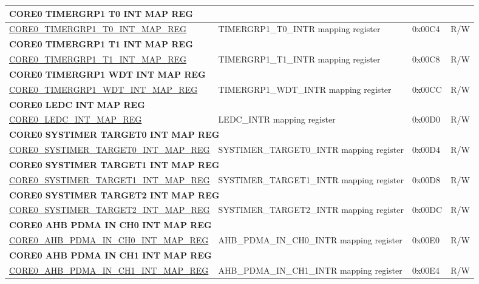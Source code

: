 \begin{longtable}{ | p{7.5cm} | p{7.2cm} | p{1.3cm} | p{1cm} | }
\multicolumn{4}{|l|}{\textbf{CORE0 TIMERGRP1 T0 INT MAP REG}} \\ \hline
\hyperref[regdesc:CORE0TIMERGRP1T0INTMAPREG]{CORE0\_TIMERGRP1\_T0\_INT\_MAP\_REG} & TIMERGRP1\_T0\_INTR mapping register & 0x00C4 & R/W \\ \hline
\multicolumn{4}{|l|}{\textbf{CORE0 TIMERGRP1 T1 INT MAP REG}} \\ \hline
\hyperref[regdesc:CORE0TIMERGRP1T1INTMAPREG]{CORE0\_TIMERGRP1\_T1\_INT\_MAP\_REG} & TIMERGRP1\_T1\_INTR mapping register & 0x00C8 & R/W \\ \hline
\multicolumn{4}{|l|}{\textbf{CORE0 TIMERGRP1 WDT INT MAP REG}} \\ \hline
\hyperref[regdesc:CORE0TIMERGRP1WDTINTMAPREG]{CORE0\_TIMERGRP1\_WDT\_INT\_MAP\_REG} & TIMERGRP1\_WDT\_INTR mapping register & 0x00CC & R/W \\ \hline
\multicolumn{4}{|l|}{\textbf{CORE0 LEDC INT MAP REG}} \\ \hline
\hyperref[regdesc:CORE0LEDCINTMAPREG]{CORE0\_LEDC\_INT\_MAP\_REG} & LEDC\_INTR mapping register & 0x00D0 & R/W \\ \hline
\multicolumn{4}{|l|}{\textbf{CORE0 SYSTIMER TARGET0 INT MAP REG}} \\ \hline
\hyperref[regdesc:CORE0SYSTIMERTARGET0INTMAPREG]{CORE0\_SYSTIMER\_TARGET0\_INT\_MAP\_REG} & SYSTIMER\_TARGET0\_INTR mapping register & 0x00D4 & R/W \\ \hline
\multicolumn{4}{|l|}{\textbf{CORE0 SYSTIMER TARGET1 INT MAP REG}} \\ \hline
\hyperref[regdesc:CORE0SYSTIMERTARGET1INTMAPREG]{CORE0\_SYSTIMER\_TARGET1\_INT\_MAP\_REG} & SYSTIMER\_TARGET1\_INTR mapping register & 0x00D8 & R/W \\ \hline
\multicolumn{4}{|l|}{\textbf{CORE0 SYSTIMER TARGET2 INT MAP REG}} \\ \hline
\hyperref[regdesc:CORE0SYSTIMERTARGET2INTMAPREG]{CORE0\_SYSTIMER\_TARGET2\_INT\_MAP\_REG} & SYSTIMER\_TARGET2\_INTR mapping register & 0x00DC & R/W \\ \hline
\multicolumn{4}{|l|}{\textbf{CORE0 AHB PDMA IN CH0 INT MAP REG}} \\ \hline
\hyperref[regdesc:CORE0AHBPDMAINCH0INTMAPREG]{CORE0\_AHB\_PDMA\_IN\_CH0\_INT\_MAP\_REG} & AHB\_PDMA\_IN\_CH0\_INTR mapping register & 0x00E0 & R/W \\ \hline
\multicolumn{4}{|l|}{\textbf{CORE0 AHB PDMA IN CH1 INT MAP REG}} \\ \hline
\hyperref[regdesc:CORE0AHBPDMAINCH1INTMAPREG]{CORE0\_AHB\_PDMA\_IN\_CH1\_INT\_MAP\_REG} & AHB\_PDMA\_IN\_CH1\_INTR mapping register & 0x00E4 & R/W \\ \hline

\end{longtable}
